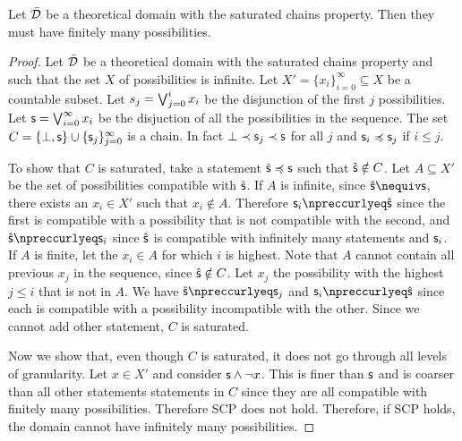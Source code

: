 \documentclass[10pt, onecolumn, longbibliography, nofootinbib]{revtex4-2}
\begin{document}
\begin{prop}
Let $\bar{\mathcal{D}}$ be a theoretical domain with the saturated chains property. Then they must have finitely many possibilities.
\end{prop}
\begin{proof}
Let $\bar{\mathcal{D}}$ be a theoretical domain with the saturated chains property and such that the set $X$ of possibilities is infinite. Let $X' = \{x_i\}_{i=0}^{\infty} \subseteq X$ be a countable subset. Let $s_j = \bigvee_{j=0}^{i} x_i$ be the disjunction of the first $j$ possibilities. Let $\mathsf{s} = \bigvee_{i=0}^{\infty} x_i$ be the disjuction of all the possibilities in the sequence. The set $C = \{ \bot, \mathsf{s} \} \cup \{\mathsf{s}_j\}_{j=0}^{\infty}$ is a chain. In fact $\bot \prec \mathsf{s}_j \prec \mathsf{s}$ for all $j$ and $\mathsf{s}_i \preccurlyeq \mathsf{s}_j$ if $i \leq j$.

To show that $C$ is saturated, take a statement $\hat{\mathsf{s}} \preccurlyeq \mathsf{s}$ such that $\hat{\mathsf{s}} \notin C$. Let $A \subseteq X'$ be the set of possibilities compatible with $\hat{\mathsf{s}}$. If $A$ is infinite, since $\hat{\stmt} \nequiv \stmt$, there exists an $x_i \in X'$ such that $x_i \notin A$. Therefore $\stmt_{i} \nnarrower \hat{\stmt}$ since the first is compatible with a possibility that is not compatible with the second, and $\hat{\stmt} \nnarrower \stmt_{i}$ since $\hat{\mathsf{s}}$ is compatible with infinitely many statements and $\mathsf{s}_{i}$. If $A$ is finite, let the $x_i \in A$ for which $i$ is highest. Note that $A$ cannot contain all previous $x_j$ in the sequence, since $\hat{\mathsf{s}} \notin C$. Let $x_j$ the possibility with the highest $j \leq i$ that is not in $A$. We have $\hat{\stmt} \nnarrower \stmt_{j}$ and $\stmt_{i} \nnarrower \hat{\stmt}$ since each is compatible with a possibility incompatible with the other. Since we cannot add other statement, $C$ is saturated.

Now we show that, even though $C$ is saturated, it does not go through all levels of granularity. Let $x \in X'$ and consider $\mathsf{s} \wedge \neg x$. This is finer than $\mathsf{s}$ and is coarser than all other statements statements in $C$ since they are all compatible with finitely many possibilities. Therefore SCP does not hold. Therefore, if SCP holds, the domain cannot have infinitely many possibilities.
\end{proof}


\end{document}
